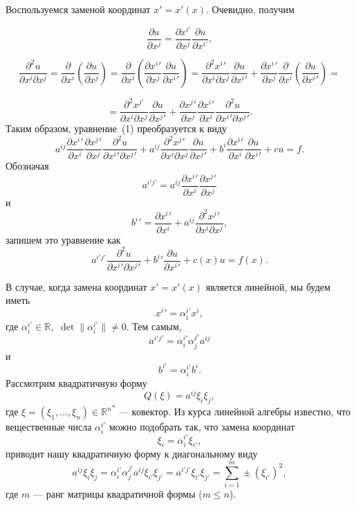 \documentclass[unicode,12pt,draft]{article}
\begin{document}
Воспользуемся заменой координат $x'=x'(x)$. Очевидно, получим

$$\frac{\partial u}{\partial x^j}=\frac{\partial x^{i'}}{\partial x^j}\frac{\partial u}{\partial x^{i'}},$$

$$\frac{\partial^2 u}{\partial x^i \partial x^j}
=\frac{\partial}{\partial x^i} \left(\frac{\partial u}{\partial
x^j}\right) =\frac{\partial}{\partial x^i}\left(\frac{\partial
{x^{i}}'}{\partial x^j}\frac{\partial u}{\partial {x^{i}}'}\right)
=\frac{\partial^2 {x^{i}}'}{\partial x^i \partial
x^j}\frac{\partial u}{\partial {x^{i}}'}+\frac{\partial
{x^{i}}'}{\partial x^j}\frac{\partial }{\partial
x^i}\left(\frac{\partial u}{\partial {x^i}'}\right)=$$

$$=\frac{\partial^2 x^{j'}}{\partial x^i \partial
x^j}\frac{\partial u}{\partial {x^{j}}'}+\frac{\partial
{x^{j}}'}{\partial x^j}\frac{\partial {x^{i}}'}{\partial
x^i}\frac{\partial^2 u}{\partial {x^{i}}' \partial {x^{j}}'}.$$
Таким образом, уравнение~(1) преобразуется к виду
$$
    a^{ij}
    \frac{
        \partial {x^{i}}'
    }{
        \partial x^i
    }
    \frac{
        \partial {x^{j}}'
    }{
        \partial x^j
    }
    \frac{
        \partial^2 u
    }{
        \partial {x^{i}}' \partial {x^{j}}'
    }
    +
    a^{ij}
    \frac{
        \partial^2 {x^{j}}'
    }{
        \partial x^i \partial x^j
    }
    \frac{
        \partial u
    }{
        \partial {x^{j}}'
    }
    +
    b^i
    \frac{
        \partial {x^{i}}'
    }{
        \partial x^i
    }
    \frac{
        \partial u
    }{
        \partial {x^{i}}'
    }
    +
    c u
    =
    f.
$$
Обозначая
$$
    a^{i'j'}
    =
    a^{ij}
    \frac{
        \partial {x^{i}}'
    }{
        \partial x^i
    }
    \frac{
        \partial {x^{j}}'
    }{
        \partial x^j}
$$
и
$$
    {b^{i}}'
    =
    \frac{
        \partial {x^{i}}'
    }{
        \partial x^i
    }
    +
    a^{ij}
    \frac{
        \partial^2 {x^{j}}'
    }{
        \partial x^i \partial x^j
    },
$$
запишем это уравнение как
$$
    a^{i'j'}
    \frac{
        \partial^2 u
    }{
        \partial {x^{i}}' \partial {x^{j}}'
    }
    +
    {b^{i}}'
    \frac{
        \partial u
    }{
        \partial {x^{i}}'
    }
    +
    c(x) u
    = f(x).
$$

В случае, когда замена координат $x'=x'(x)$ является линейной, мы будем иметь
$$
    {x^{i}}'
    =
    \alpha_i^{i'}
    x^i,
$$
где
$
    \alpha_i^{i'}
    \in
    \mathbb R,
$
$
    \det  \| \alpha_i^{i'} \|
    \ne
    0.
$
Тем самым,
$$
    a^{i'j'}
    =
    \alpha_i^{i'}
    \alpha_j^{j'}
    a^{ij}
$$
и
$$
    b^{i'}
    =
    \alpha_i^{i'} b^i.
$$
Рассмотрим квадратичную форму
$$
    Q (\xi) =
    a^{ij} \xi_i \xi_j,
$$
где $\xi=(\xi_1,\ldots,\xi_n)\in {\mathbb R^n}^*$ ---  ковектор.
Из курса линейной алгебры известно, что вещественные числа
$\alpha_i^{i'}$ можно подобрать так, что замена координат
$$\xi_i=\alpha_i^{i'}\xi_{i'},$$
приводит нашу квадратичную форму к диагональному виду
$$a^{ij}\xi_i\xi_j=\alpha_i^{i'}\alpha_j^{j'}a^{ij}\xi_{i'}\xi_{j'}=a^{i'j'}\xi_{i'}\xi_{j'}=\sum_{i=1}^m
\pm (\xi_{i'})^2,$$
где $m$ --- ранг матрицы квадратичной формы ($m \le n$).
\end{document}
